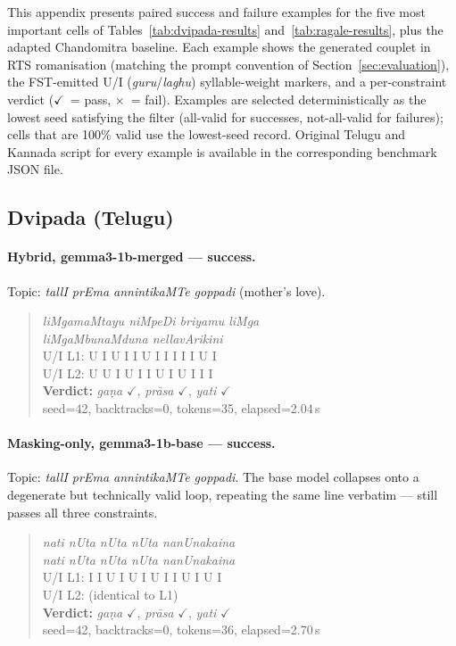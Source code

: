 \documentclass[11pt]{article}
\begin{document}
This appendix presents paired success and failure examples for the
five most important cells of Tables~\ref{tab:dvipada-results}
and~\ref{tab:ragale-results}, plus the adapted Chandomitra baseline.
Each example shows the generated couplet in RTS romanisation
(matching the prompt convention of Section~\ref{sec:evaluation}), the
FST-emitted U/I (\textit{guru}/\textit{laghu}) syllable-weight markers,
and a per-constraint verdict ($\checkmark$~= pass, $\times$~= fail).
Examples are selected deterministically as the lowest seed satisfying
the filter (all-valid for successes, not-all-valid for failures); cells
that are 100\% valid use the lowest-seed record. Original Telugu and
Kannada script for every example is available in the corresponding
benchmark JSON file.

\subsection{Dvipada (Telugu)}
\label{app:examples_dvipada}

\paragraph{Hybrid, gemma3-1b-merged --- success.}
Topic: \textit{tallI prEma annintikaMTe goppadi} (mother's love).

\begin{quote}
\textit{liMgamaMtayu niMpeDi briyamu liMga} \\
\textit{liMgaMbunaMduna nellavArikini} \\
\textsc{U/I L1:} U I U I I U I I I I I U I \\
\textsc{U/I L2:} U U I U I I U I U I I I \\
\textbf{Verdict:} \textit{ga\d{n}a} $\checkmark$,
\textit{pr\={a}sa} $\checkmark$, \textit{yati} $\checkmark$
\\ {\footnotesize seed=42, backtracks=0, tokens=35, elapsed=2.04\,s}
\end{quote}

\paragraph{Masking-only, gemma3-1b-base --- success.}
Topic: \textit{tallI prEma annintikaMTe goppadi}. The base model
collapses onto a degenerate but technically valid loop, repeating the
same line verbatim --- still passes all three constraints.

\begin{quote}
\textit{nati nUta nUta nUta nanUnakaina} \\
\textit{nati nUta nUta nUta nanUnakaina} \\
\textsc{U/I L1:} I I U I U I U I I U I U I \\
\textsc{U/I L2:} (identical to L1) \\
\textbf{Verdict:} \textit{ga\d{n}a} $\checkmark$,
\textit{pr\={a}sa} $\checkmark$, \textit{yati} $\checkmark$
\\ {\footnotesize seed=42, backtracks=0, tokens=36, elapsed=2.70\,s}
\end{quote}
\end{document}
